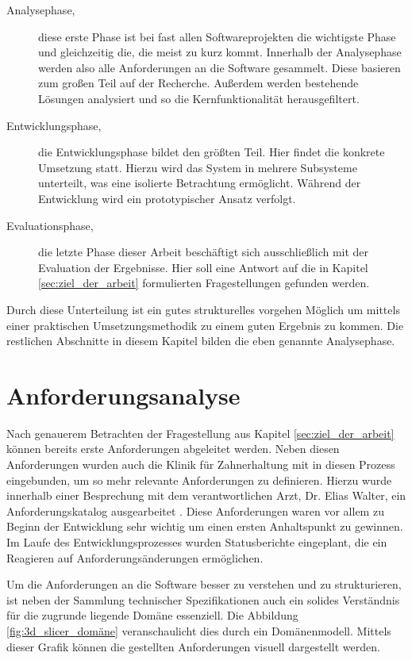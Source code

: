 \begin{description}
	\item[Analysephase,] diese erste Phase ist bei fast allen Softwareprojekten die
		wichtigste Phase und gleichzeitig die, die meist zu kurz kommt. Innerhalb der
		Analysephase werden also alle Anforderungen an die Software gesammelt. Diese
		basieren zum großen Teil auf der Recherche. Außerdem werden bestehende Lösungen
		analysiert und so die Kernfunktionalität herausgefiltert.

	\item[Entwicklungsphase,] die Entwicklungsphase bildet den größten Teil. Hier
		findet die konkrete Umsetzung statt. Hierzu wird das System in mehrere Subsysteme
		unterteilt, was eine isolierte Betrachtung ermöglicht. Während der Entwicklung
		wird ein prototypischer Ansatz verfolgt.

	\item[Evaluationsphase,] die letzte Phase dieser Arbeit beschäftigt sich ausschließlich
		mit der Evaluation der Ergebnisse. Hier soll eine Antwort auf die in Kapitel
		\ref{sec:ziel_der_arbeit} formulierten Fragestellungen gefunden werden.
\end{description}

Durch diese Unterteilung ist ein gutes strukturelles vorgehen Möglich um mittels
einer praktischen Umsetzungsmethodik zu einem guten Ergebnis zu kommen. Die
restlichen Abschnitte in diesem Kapitel bilden die eben genannte Analysephase.

\section{Anforderungsanalyse}
\label{sec:anforderungsanalyse} Nach genauerem Betrachten der Fragestellung aus
Kapitel \ref{sec:ziel_der_arbeit} können bereits erste Anforderungen abgeleitet
werden. Neben diesen Anforderungen wurden auch die Klinik für Zahnerhaltung mit in
diesen Prozess eingebunden, um so mehr relevante Anforderungen zu definieren. Hierzu
wurde innerhalb einer Besprechung mit dem verantwortlichen Arzt, Dr. Elias Walter,
ein Anforderungskatalog ausgearbeitet \citep[vgl.][]{walter2025}. Diese
Anforderungen waren vor allem zu Beginn der Entwicklung sehr wichtig um einen
ersten Anhaltspunkt zu gewinnen. Im Laufe des Entwicklungsprozesses wurden Statusberichte
eingeplant, die ein Reagieren auf Anforderungsänderungen ermöglichen.

Um die Anforderungen an die Software besser zu verstehen und zu strukturieren, ist
neben der Sammlung technischer Spezifikationen auch ein solides Verständnis für die
zugrunde liegende Domäne essenziell. Die Abbildung \ref{fig:3d_slicer_domäne}
veranschaulicht dies durch ein Domänenmodell. Mittels dieser Grafik können die gestellten
Anforderungen visuell dargestellt werden.

